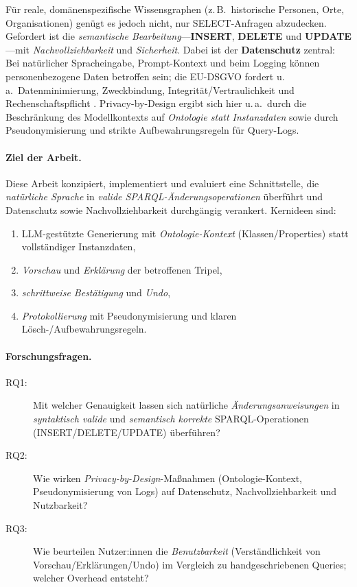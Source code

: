 Für reale, domänenspezifische Wissensgraphen (z.\,B.\ historische Personen, Orte, Organisationen) genügt es jedoch nicht, nur SELECT-Anfragen abzudecken. Gefordert ist die \emph{semantische Bearbeitung}—\textbf{INSERT}, \textbf{DELETE} und \textbf{UPDATE}—mit \emph{Nachvollziehbarkeit} und \emph{Sicherheit}. Dabei ist der \textbf{Datenschutz} zentral: Bei natürlicher Spracheingabe, Prompt-Kontext und beim Logging können personenbezogene Daten betroffen sein; die EU-DSGVO fordert u.\,a.\ Datenminimierung, Zweckbindung, Integrität/Vertraulichkeit und Rechenschaftspflicht \cite{euGDPR2016}. Privacy-by-Design ergibt sich hier u.\,a.\ durch die Beschränkung des Modellkontexts auf \emph{Ontologie statt Instanzdaten} sowie durch Pseudo\-nymisierung und strikte Aufbewahrungsregeln für Query-Logs.

\paragraph{Ziel der Arbeit.}
Diese Arbeit konzipiert, implementiert und evaluiert eine Schnittstelle, die \emph{natürliche Sprache} in \emph{valide SPARQL-Änderungsoperationen} überführt und Datenschutz sowie Nachvollziehbarkeit durchgängig verankert. Kernideen sind:
\begin{enumerate}
  \item LLM-gestützte Generierung mit \emph{Ontologie-Kontext} (Klassen/Properties) statt vollständiger Instanzdaten,
  \item \emph{Vorschau} und \emph{Erklärung} der betroffenen Tripel,
  \item \emph{schrittweise Bestätigung} und \emph{Undo},
  \item \emph{Protokollierung} mit Pseudonymisierung und klaren Lösch-/Aufbewahrungsregeln.
\end{enumerate}

\paragraph{Forschungsfragen.}
\begin{description}
  \item[RQ1:] Mit welcher Genauigkeit lassen sich natürliche \emph{Änderungsanweisungen} in \emph{syntaktisch valide} und \emph{semantisch korrekte} SPARQL-Operationen (INSERT/DELETE/UPDATE) überführen?
  \item[RQ2:] Wie wirken \emph{Privacy-by-Design}-Maßnahmen (Ontologie-Kontext, Pseudonymisierung von Logs) auf Datenschutz, Nachvollziehbarkeit und Nutzbarkeit?
  \item[RQ3:] Wie beurteilen Nutzer:innen die \emph{Benutzbarkeit} (Verständlichkeit von Vorschau/Erklärungen/Undo) im Vergleich zu handgeschriebenen Queries; welcher Overhead entsteht?
\end{description}

